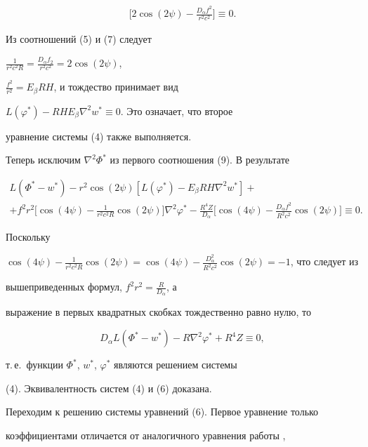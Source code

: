 \begin{pf}
\begin{multline*}
\bigg[2\cos(2\psi)-\frac{D_\alpha f^2}{r^2c^2}\bigg]\equiv 0. 


\end{multline*} 


Из соотношений (5) и (7) следует 


$\frac{1}{r^2c^2R}=\frac{D_\alpha f_2}{r^2c^2}=2\cos(2\psi)$, 


$\frac{f^2}{r^2}=E_\beta R H$, и тождество принимает вид 


$L(\varphi^*)-R H E_\beta\nabla^2w^*\equiv 0$. Это означает, что второе 


уравнение системы (4) также выполняется. 


Теперь исключим $\nabla^2\Phi^*$ из первого соотношения (9). В результате 


\begin{multline*} 


L(\Phi^*-w^*)-r^2\cos(2\psi)[L(\varphi^*)-E_\beta R H\nabla^2w^*]+\\ 


+f^2r^2\bigg[\cos(4\psi)-\frac{1}{r^2c^2R}\cos(2\psi)\bigg] 


\nabla^2\varphi^*-\frac{R^4Z}{D_\alpha}\bigg[\cos(4\psi)- 


\frac{D_\alpha f^2}{R^2c^2}\cos(2\psi)\bigg]\equiv 0. 


\end{multline*} 


Поскольку 


$\cos(4\psi)-\frac{1}{r^2c^2R}\cos(2\psi)=\cos(4\psi)- 


\frac{D_\alpha ^2}{R^2c^2}\cos(2\psi)=-1$, что следует из 


вышеприведенных формул, $f^2r^2=\frac{R}{D_\alpha}$, а 


выражение в первых квадратных скобках тождественно равно нулю, то


$$ 


D_\alpha L(\Phi^*-w^*)-R\nabla^2\varphi^*+R^4Z\equiv 0, 


$$ 


т.\,е.~функции $\Phi^*$, $w^*$, $\varphi^*$ являются решением системы 


(4). Эквивалентность систем (4) и (6) доказана. 


 


Переходим к решению системы уравнений (6). Первое уравнение только 


коэффициентами отличается от аналогичного уравнения работы \cite{1}, 



\end{pf}
